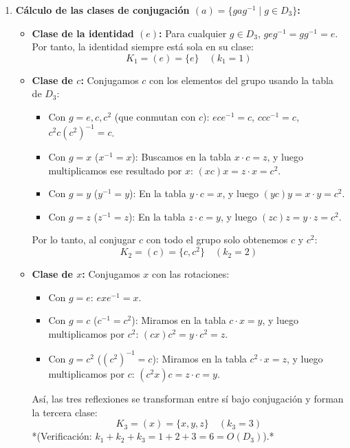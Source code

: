 \documentclass[11pt, a4paper]{article}
\begin{document}
\begin{enumerate}
    \item \textbf{Cálculo de las clases de conjugación $(a) = \{gag^{-1} \mid g \in D_3\}$:}
    \begin{itemize}
        \item \textbf{Clase de la identidad $(e)$:} Para cualquier $g \in D_3$, $geg^{-1} = gg^{-1} = e$. Por tanto, la identidad siempre está sola en su clase:
        \[
        K_1 = (e) = \{e\} \quad (k_1 = 1)
        \]
        \item \textbf{Clase de $c$:} Conjugamos $c$ con los elementos del grupo usando la tabla de $D_3$:
        \begin{itemize}
            \item Con $g = e, c, c^2$ (que conmutan con $c$): $ece^{-1} = c$, $ccc^{-1} = c$, $c^2 c (c^2)^{-1} = c$.
            \item Con $g = x$ ($x^{-1} = x$): Buscamos en la tabla $x \cdot c = z$, y luego multiplicamos ese resultado por $x$: $(xc)x = z \cdot x = c^2$.
            \item Con $g = y$ ($y^{-1} = y$): En la tabla $y \cdot c = x$, y luego $(yc)y = x \cdot y = c^2$.
            \item Con $g = z$ ($z^{-1} = z$): En la tabla $z \cdot c = y$, y luego $(zc)z = y \cdot z = c^2$.
        \end{itemize}
        Por lo tanto, al conjugar $c$ con todo el grupo solo obtenemos $c$ y $c^2$:
        \[
        K_2 = (c) = \{c, c^2\} \quad (k_2 = 2)
        \]
        \item \textbf{Clase de $x$:} Conjugamos $x$ con las rotaciones:
        \begin{itemize}
            \item Con $g = e$: $exe^{-1} = x$.
            \item Con $g = c$ ($c^{-1} = c^2$): Miramos en la tabla $c \cdot x = y$, y luego multiplicamos por $c^2$: $(cx)c^2 = y \cdot c^2 = z$.
            \item Con $g = c^2$ ($(c^2)^{-1} = c$): Miramos en la tabla $c^2 \cdot x = z$, y luego multiplicamos por $c$: $(c^2 x)c = z \cdot c = y$.
        \end{itemize}
        Así, las tres reflexiones se transforman entre sí bajo conjugación y forman la tercera clase:
        \[
        K_3 = (x) = \{x, y, z\} \quad (k_3 = 3)
        \]
        *(Verificación: $k_1 + k_2 + k_3 = 1 + 2 + 3 = 6 = O(D_3)$).*
    \end{itemize}


\end{enumerate}
\end{document}
